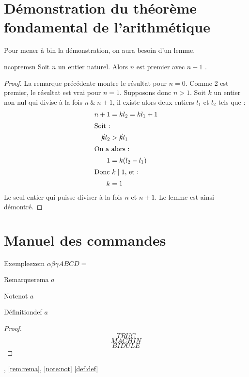 \documentclass[a4paper,french,final]{memoir}
\begin{document}
\chapter{Démonstration du théorème fondamental de l'arithmétique}\label{annexe:thmfondarith}
Pour mener à bin la démonstration, on aura besoin d'un lemme.
\begin{lemmab}{}{ncopremsn}
  Soit $n$ un entier naturel. Alors $n$ est premier avec $n+1$ .
\end{lemmab}
\begin{proof}
La remarque précédente montre le résultat pour $n=0$. Comme 2 est premier, le résultat est vrai pour $n=1$. Supposons donc $n>1$. Soit  $k$ un entier non-nul qui divise à la fois $n~\&~n+1$, il existe alors deux entiers $l_1$ et $l_2$ tels que :
\begin{align*}
  n+1& =kl_2=kl_{1}+1\\
\shortintertext{Soit~:}
\cancel{k}l_2& >\cancel{k}l_1\\
\shortintertext{On a alors~:}
1& =k(l_2-l_1)\\
\intertext{Donc $k \mid 1$, et : }
k& =1
\end{align*}
Le seul entier qui puisse diviser à la fois $n$ et $n+1$. Le lemme est ainsi démontré.
\end{proof}
\chapter{Manuel des commandes}
\begin{theoremb}{Exemple}{exem}
\(\alpha\beta\gamma ABCD=\)
\end{theoremb}
\begin{remarkb}{Remarque}{rema}
\(a\)
\end{remarkb}
\begin{noteb}{Note}{not}
$a$
\end{noteb}
\begin{defb}{Définition}{def}
$a$
\end{defb}
\begin{proof}
\[TRUC\]
\proofpart{}
\[MACHIN\]
\[BIDULE\]
\end{proof}
, \cref{rem:rema}, \cref{note:not} \cref{def:def}
\backmatter
\end{document}
